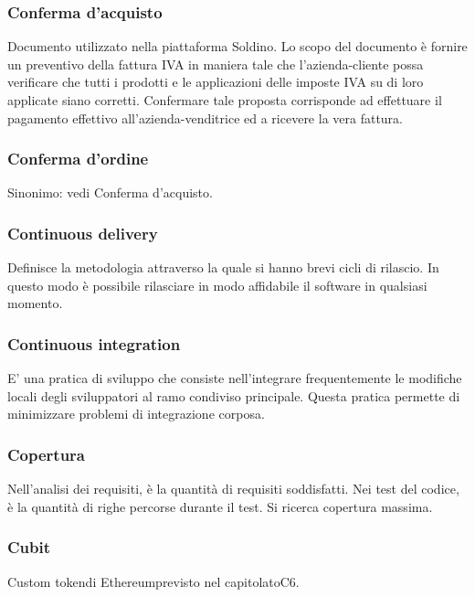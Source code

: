 \subsubsection*{Conferma d'acquisto}
Documento utilizzato nella piattaforma Soldino. Lo scopo del documento è fornire un preventivo della fattura IVA in maniera tale che l'azienda-cliente possa verificare che tutti i prodotti e le applicazioni delle imposte IVA su di loro applicate siano corretti. Confermare tale proposta corrisponde ad effettuare il pagamento effettivo all'azienda-venditrice ed a ricevere la vera fattura.

\subsubsection*{Conferma d'ordine}
Sinonimo: vedi Conferma d'acquisto\glo.

\subsubsection*{Continuous delivery}
Definisce la metodologia attraverso la quale si hanno brevi cicli di rilascio. In questo modo è possibile rilasciare in modo affidabile il software in qualsiasi momento.

\subsubsection*{Continuous integration}
E’ una pratica di sviluppo che consiste nell’integrare frequentemente le modifiche locali degli sviluppatori al
ramo condiviso principale. Questa pratica permette di minimizzare problemi di integrazione corposa.

\subsubsection*{Copertura}
Nell'analisi dei requisiti, è la quantità di requisiti soddisfatti. Nei test del codice, è la quantità di righe percorse durante il test. Si ricerca copertura massima.

\subsubsection*{Cubit}
Custom token\glosp di Ethereum\glosp previsto nel capitolato\glosp C6.

